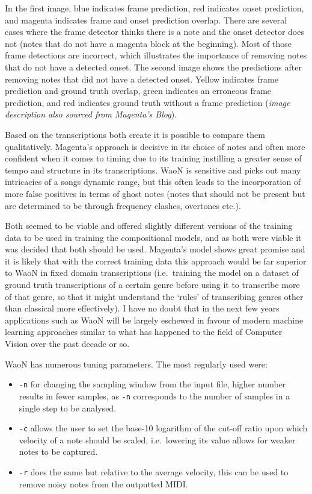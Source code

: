 \documentclass[12pt,]{article}
\providecommand{\tightlist}{%
  \setlength{\itemsep}{0pt}\setlength{\parskip}{0pt}}
\begin{document}
In the first image, blue indicates frame prediction, red indicates onset
prediction, and magenta indicates frame and onset prediction overlap.
There are several cases where the frame detector thinks there is a note
and the onset detector does not (notes that do not have a magenta block
at the beginning). Most of those frame detections are incorrect, which
illustrates the importance of removing notes that do not have a detected
onset. The second image shows the predictions after removing notes that
did not have a detected onset. Yellow indicates frame prediction and
ground truth overlap, green indicates an erroneous frame prediction, and
red indicates ground truth without a frame prediction
(\textit{image description also sourced from Magenta's Blog}).

Based on the transcriptions both create it is possible to compare them
qualitatively. Magenta's approach is decisive in its choice of notes and
often more confident when it comes to timing due to its training
instilling a greater sense of tempo and structure in its transcriptions.
WaoN is sensitive and picks out many intricacies of a songs dynamic
range, but this often leads to the incorporation of more false positives
in terms of ghost notes (notes that should not be present but are
determined to be through frequency clashes, overtones etc.).

Both seemed to be viable and offered slightly different versions of the
training data to be used in training the compositional models, and as
both were viable it was decided that both should be used. Magenta's
model shows great promise and it is likely that with the correct
training data this approach would be far superior to WaoN in fixed
domain transcriptions (i.e.~training the model on a dataset of ground
truth transcriptions of a certain genre before using it to transcribe
more of that genre, so that it might understand the `rules' of
transcribing genres other than classical more effectively). I have no
doubt that in the next few years applications such as WaoN will be
largely eschewed in favour of modern machine learning approaches similar
to what has happened to the field of Computer Vision over the past
decade or so.

WaoN has numerous tuning parameters. The most regularly used were:

\begin{itemize}
\tightlist
\item
  \texttt{-n} for changing the sampling window from the input file,
  higher number results in fewer samples, as \texttt{-n} corresponds to
  the number of samples in a single step to be analysed.
\item
  \texttt{-c} allows the user to set the base-10 logarithm of the
  cut-off ratio upon which velocity of a note should be scaled,
  i.e.~lowering its value allows for weaker notes to be captured.
\item
  \texttt{-r} does the same but relative to the average velocity, this
  can be used to remove noisy notes from the outputted MIDI.
\end{itemize}
\end{document}
